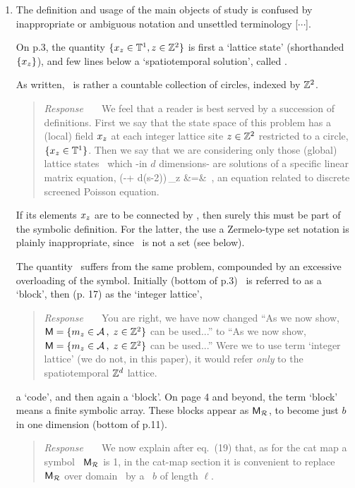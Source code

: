 \documentclass[12pt]{iopart}
\begin{document}
\begin{enumerate}
  \item
The definition and usage of the main objects of study is confused by
inappropriate or ambiguous notation and unsettled terminology
[$\cdots$].

On p.3, the quantity
 \(
\{x_{z} \in  \mathbb{T}^{1},  z\in \mathbb{Z}^{2}\}
 \)
is first a `lattice state' (shorthanded
$\{x_{z}\}$), and
few lines below a `spatiotemporal solution', called \Xx.

As written, \Xx\ is rather a countable
collection of circles, indexed by $\mathbb{Z}^{2}$.

\begin{quote}
{\em Response~~~}
We feel that a reader is best served by a succession of definitions.
First we say that the state space of this
problem has a (local) field $x_{z}$ at each integer lattice site
$z\in \mathbb{Z}^{2}$ restricted to
a circle,
\(
\{x_{z} \in  \mathbb{T}^{1}\}
 \).
Then we say that we are considering only those (global) lattice states
\Xx\ which -in $d$ dimensions- are solutions of a specific linear matrix equation,
\bea
 (-\Box + d(s-2))\,\ssp_{z} &=& 
\,,
\label{LinearConn}
\eea
an equation related to
discrete screened Poisson equation.
\end{quote}


If its elements $x_{z}$ are to be connected by , then surely this
must be part of the symbolic definition. For the latter, the use a
Zermelo-type set notation is plainly inappropriate, since \Xx\ is not a
set (see below).

The quantity \Mm\ suffers from the same problem, compounded by an
excessive overloading of the symbol. Initially (bottom of p.3) \Mm\ is
referred to as a `block', then (p. 17) as
the `integer lattice',
    \begin{quote}
{\em Response~~~}
You are right, we have now changed
``As we now show,  
\(
\mathsf{M}= \{{m_{z}} \in \mathcal{A} \,,\; z\in \mathbb{Z}^2 \}
\)
can be used...'' to
``As we now show,
\(
\mathsf{M}= \{{m_{z}} \in \mathcal{A} \,,\; z\in \mathbb{Z}^2 \}
\)
can be used...''
Were we to use term `integer lattice' (we do not, in this paper), it
would refer \emph{only} to the spatiotemporal $\mathbb{Z}^{d}$ lattice.
    \end{quote}
a `code',
and then again a `block'. On page 4 and beyond, the term `block' means a
finite symbolic array. These blocks appear as $\mathsf{M}_{\mathcal{R}}$, to become just
$b$ in one dimension (bottom of p.11).
    \begin{quote}
{\em Response~~~} We now explain after eq.~(19) that, as
for the cat map a symbol \brick\ $\mathsf{M}_{\mathcal{R}}$ is 1\dmn, in the cat-map section
it is convenient to replace \brick\ $\mathsf{M}_{\mathcal{R}}$
over domain \R\ by a \brick\ $b$ of length $\ell$.
    \end{quote}


\end{enumerate}
\end{document}
